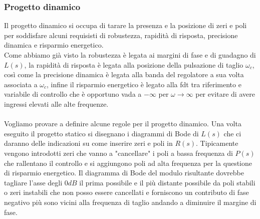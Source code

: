 \documentclass[a4paper]{article}
\begin{document}
	\subsubsection{Progetto dinamico}
	Il progetto dinamico si occupa di tarare la presenza e la posizione di zeri e poli per soddisfare alcuni requisisti di robustezza, rapidità di risposta, precisione dinamica e risparmio energetico.
	\\Come abbiamo già visto la robustezza è legata ai margini di fase e di guadagno di $ L(s) $, la rapidità di risposta è legata alla posizione della pulsazione di taglio $ \omega_c $, così come la precisione dinamica è legata alla banda del regolatore a sua volta associata a $\omega_c$, infine il risparmio energetico è legato alla fdt tra riferimento e variabile di controllo che è opportuno vada a $ -\infty $ per $\omega\to\infty$ per evitare di avere ingressi elevati alle alte frequenze.
	\\\\Vogliamo provare a definire alcune regole per il progetto dinamico.
	Una volta eseguito il progetto statico si disegnano i diagrammi di Bode di $ L(s) $ che ci daranno delle indicazioni su come inserire zeri e poli in $ R(s) $. Tipicamente vengono introdotti zeri che vanno a "cancellare" i poli a bassa frequenza di $ P(s) $ che rallentano il controllo e si aggiungono poli ad alta frequenza per la questione di risparmio energetico. Il diagramma di Bode del modulo risultante dovrebbe tagliare l'asse degli $ 0dB $ il prima possibile e il più distante possibile da poli stabili o zeri instabili che non posso essere cancellati e forniscono un contributo di fase negativo più sono vicini alla frequenza di taglio andando a diminuire il margine di fase.
	
\end{document}
